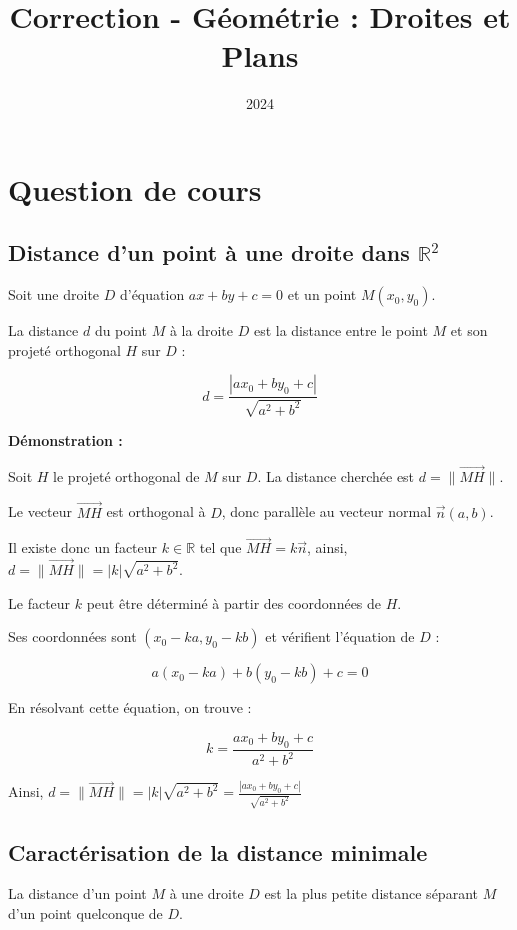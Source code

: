 \documentclass[10pt,a4paper]{article}
\title{Correction - Géométrie : Droites et Plans}
\author{}
\date{2024}
\begin{document}
\maketitle

\section*{Question de cours}

\subsection*{Distance d'un point à une droite dans $\mathbb{R}^2$}

Soit une droite $D$ d'équation $ax + by + c = 0$ et un point $M(x_0, y_0)$.

La distance $d$ du point $M$ à la droite $D$ est la distance entre le point $M$ et son projeté
orthogonal $H$ sur $D$ :

\[ d = \frac{|ax_0 + by_0 + c|}{\sqrt{a^2 + b^2}} \]

\textbf{Démonstration :}

Soit $H$ le projeté orthogonal de $M$ sur $D$. La distance cherchée est $d = \|\vec{MH}\|$.

Le vecteur $\vec{MH}$ est orthogonal à $D$, donc parallèle au vecteur normal $\vec{n}(a,b)$.

Il existe donc un facteur $k \in \mathbb{R}$ tel que $\vec{MH} = k\vec{n}$,
ainsi, $d = \|\vec{MH}\| = |k|\sqrt{a^2 + b^2}$.

Le facteur $k$ peut être déterminé à partir des coordonnées de $H$.

Ses coordonnées sont $(x_0 - ka, y_0 - kb)$ et vérifient l'équation de $D$ :

\[ a(x_0 - ka) + b(y_0 - kb) + c = 0 \]

En résolvant cette équation, on trouve :

\[ k = \frac{ax_0 + by_0 + c}{a^2 + b^2} \]

Ainsi, $d = \|\vec{MH}\| = |k|\sqrt{a^2 + b^2} = \frac{|ax_0 + by_0 + c|}{\sqrt{a^2 + b^2}}$

\subsection*{Caractérisation de la distance minimale}

La distance d'un point $M$ à une droite $D$ est la plus petite distance séparant $M$ d'un point quelconque de $D$.
\end{document}

